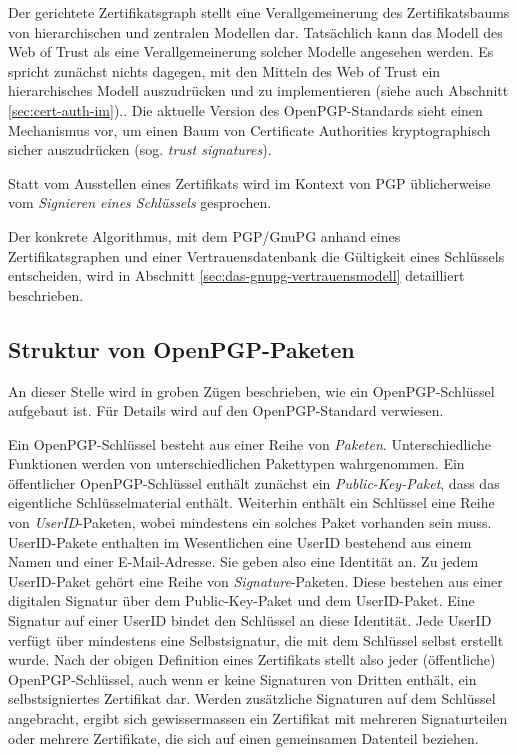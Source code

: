 Der gerichtete Zertifikatsgraph stellt eine Verallgemeinerung des
Zertifikatsbaums von hierarchischen und zentralen Modellen
dar. Tats\"achlich kann das Modell des Web of Trust als eine
Verallgemeinerung solcher Modelle angesehen werden. Es spricht
zun\"achst nichts dagegen, mit den Mitteln des Web of Trust ein
hierarchisches Modell auszudr\"ucken und zu implementieren (siehe auch
Abschnitt \ref{sec:cert-auth-im}).. Die aktuelle Version des
OpenPGP-Standards sieht einen Mechanismus vor, um einen Baum von
Certificate Authorities kryptographisch sicher auszudr\"ucken
(sog. \emph{trust signatures}).

Statt vom Ausstellen eines Zertifikats wird im Kontext von PGP
\"ublicherweise vom \emph{Signieren eines Schl\"ussels} gesprochen.

Der konkrete Algorithmus, mit dem PGP/GnuPG anhand eines
Zertifikatsgraphen und einer Vertrauensdatenbank die G\"ultigkeit
eines Schl\"ussels entscheiden, wird in Abschnitt
\ref{sec:das-gnupg-vertrauensmodell} detailliert beschrieben.

\subsection{Struktur von OpenPGP-Paketen}
\label{sec:structure-openpgp}
An dieser Stelle wird in groben Z\"ugen beschrieben, wie ein
OpenPGP-Schl\"ussel aufgebaut ist. F\"ur Details wird auf den
OpenPGP-Standard\cite{Callas2007} verwiesen.

Ein OpenPGP-Schl\"ussel besteht aus einer Reihe von
\emph{Paketen}. Unterschiedliche Funktionen werden von
unterschiedlichen Pakettypen wahrgenommen. Ein \"offentlicher
OpenPGP-Schl\"ussel enth\"alt zun\"achst ein \emph{Public-Key-Paket},
dass das eigentliche Schl\"usselmaterial enth\"alt. Weiterhin
enth\"alt ein Schl\"ussel eine Reihe von \emph{UserID}-Paketen, wobei
mindestens ein solches Paket vorhanden sein muss. UserID-Pakete
enthalten im Wesentlichen eine UserID bestehend aus einem Namen und
einer E-Mail-Adresse. Sie geben also eine Identit\"at an. Zu jedem
UserID-Paket geh\"ort eine Reihe von \emph{Signature}-Paketen. Diese
bestehen aus einer digitalen Signatur \"uber dem Public-Key-Paket und
dem UserID-Paket. Eine Signatur auf einer UserID bindet den
Schl\"ussel an diese Identit\"at. Jede UserID verf\"ugt \"uber
mindestens eine Selbstsignatur, die mit dem Schl\"ussel selbst
erstellt wurde. Nach der obigen Definition eines Zertifikats stellt
also jeder (\"offentliche) OpenPGP-Schl\"ussel, auch wenn er keine
Signaturen von Dritten enth\"alt, ein selbstsigniertes Zertifikat
dar. Werden zus\"atzliche Signaturen auf dem Schl\"ussel angebracht,
ergibt sich gewissermassen ein Zertifikat mit mehreren Signaturteilen
oder mehrere Zertifikate, die sich auf einen gemeinsamen Datenteil
beziehen.

